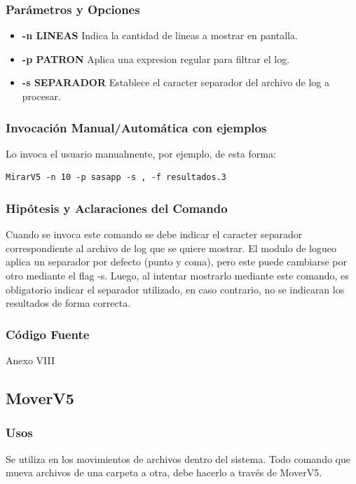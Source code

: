 \documentclass[a4paper,10pt,titlepage]{article}
\begin{document}
		\subsubsection{Par\'ametros y Opciones}
			\begin {itemize}
				\item \textbf{-n LINEAS} {Indica la cantidad de lineas a mostrar en pantalla.}
				\item \textbf{-p PATRON} {Aplica una expresion regular para filtrar el log.}
				\item \textbf{-s SEPARADOR} {Establece el caracter separador del archivo de log a procesar.}
			\end{itemize}
	
		\subsubsection{Invocaci\'on Manual/Autom\'atica con ejemplos}

Lo invoca el usuario manualmente, por ejemplo, de esta forma:

\begin{verbatim}
MirarV5 -n 10 -p sasapp -s , -f resultados.3
\end{verbatim}

		\subsubsection{Hip\'otesis y Aclaraciones del Comando}

Cuando se invoca este comando se debe indicar el caracter separador correspondiente al archivo de log que se quiere mostrar. El modulo de logueo aplica un separador por defecto (punto y coma), pero este puede cambiarse por otro mediante el flag -s. Luego, al intentar mostrarlo mediante este comando, es obligatorio indicar el separador utilizado, en caso contrario, no se indicaran los resultados de forma correcta.

		\subsubsection{C\'odigo Fuente}
			Anexo VIII


	\subsection{MoverV5}
		\subsubsection{Usos}
			Se utiliza en los movimientos de archivos dentro del sistema. Todo comando que mueva archivos de una carpeta a otra, debe hacerlo a trav\'es de MoverV5.
\end{document}
